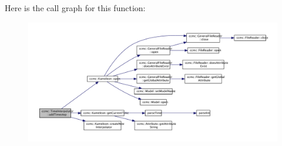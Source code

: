 Here is the call graph for this function\-:\nopagebreak
\begin{figure}[H]
\begin{center}
\leavevmode
\includegraphics[width=350pt]{classccmc_1_1_time_interpolator_aaa61a9153116b891697833dfa46d16c9_cgraph}
\end{center}
\end{figure}


